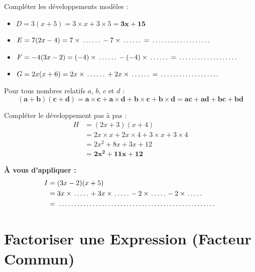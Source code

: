 \begin{cadremethode}
Compléter les développements modèles :
\begin{itemize}
    \item $D = 3(x + 5) = 3 \times x + 3 \times 5 = \mathbf{3x + 15}$
    \item $E = 7(2x - 4) = 7 \times \pointille[1cm] - 7 \times \pointille[1cm] = \pointille[3cm]$
    \item $F = -4(3x - 2) = (-4) \times \pointille[1cm] - (-4) \times \pointille[1cm] = \pointille[3cm]$
    \item $G = 2x(x + 6) = 2x \times \pointille[1cm] + 2x \times \pointille[1cm] = \pointille[3cm]$
\end{itemize}
\end{cadremethode}

\begin{cadreprop}
Pour tous nombres relatifs $a$, $b$, $c$ et $d$ :
\[ \mathbf{(a + b)(c + d) = a \times c + a \times d + b \times c + b \times d = ac + ad + bc + bd} \]
\end{cadreprop}

\begin{cadremethode}
Compléter le développement pas à pas :
\begin{align*}
H &= (2x + 3)(x + 4) \\
  &= 2x \times x + 2x \times 4 + 3 \times x + 3 \times 4 \\
  &= 2x^2 + 8x + 3x + 12 \\
  &= \mathbf{2x^2 + 11x + 12}
\end{align*}

\textbf{À vous d'appliquer :}
\begin{align*}
I &= (3x - 2)(x + 5) \\
  &= 3x \times \pointille[0.8cm] + 3x \times \pointille[0.8cm] - 2 \times \pointille[0.8cm] - 2 \times \pointille[0.8cm] \\
  &= \pointille[8cm]
\end{align*}
\end{cadremethode}

\section{Factoriser une Expression (Facteur Commun)}

